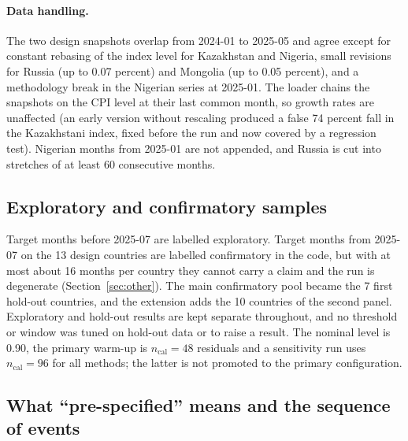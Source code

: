 \paragraph{Data handling.} The two design snapshots overlap from 2024-01 to 2025-05 and agree except for constant rebasing of the index level for Kazakhstan and Nigeria, small revisions for Russia (up to 0.07 percent) and Mongolia (up to 0.05 percent), and a methodology break in the Nigerian series at 2025-01. The loader chains the snapshots on the CPI level at their last common month, so growth rates are unaffected (an early version without rescaling produced a false 74 percent fall in the Kazakhstani index, fixed before the run and now covered by a regression test). Nigerian months from 2025-01 are not appended, and Russia is cut into stretches of at least 60 consecutive months.

\subsection{Exploratory and confirmatory samples}\label{sec:samples}

Target months before 2025-07 are labelled exploratory. Target months from 2025-07 on the 13 design countries are labelled confirmatory in the code, but with at most about 16 months per country they cannot carry a claim and the run is degenerate (Section~\ref{sec:other}). The main confirmatory pool became the 7 first hold-out countries, and the extension adds the 10 countries of the second panel. Exploratory and hold-out results are kept separate throughout, and no threshold or window was tuned on hold-out data or to raise a result. The nominal level is 0.90, the primary warm-up is $n_{\mathrm{cal}}=48$ residuals and a sensitivity run uses $n_{\mathrm{cal}}=96$ for all methods; the latter is not promoted to the primary configuration.

\subsection{What ``pre-specified'' means and the sequence of events}\label{sec:prespec}

